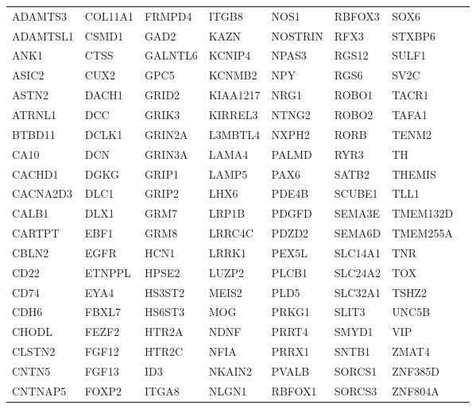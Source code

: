 \begin{tabular}{llllllll}
ADAMTS3 & COL11A1 & FRMPD4 & ITGB8 & NOS1 & RBFOX3 & SOX6 &  \\
ADAMTSL1 & CSMD1 & GAD2 & KAZN & NOSTRIN & RFX3 & STXBP6 &  \\
ANK1 & CTSS & GALNTL6 & KCNIP4 & NPAS3 & RGS12 & SULF1 &  \\
ASIC2 & CUX2 & GPC5 & KCNMB2 & NPY & RGS6 & SV2C &  \\
ASTN2 & DACH1 & GRID2 & KIAA1217 & NRG1 & ROBO1 & TACR1 &  \\
ATRNL1 & DCC & GRIK3 & KIRREL3 & NTNG2 & ROBO2 & TAFA1 &  \\
BTBD11 & DCLK1 & GRIN2A & L3MBTL4 & NXPH2 & RORB & TENM2 &  \\
CA10 & DCN & GRIN3A & LAMA4 & PALMD & RYR3 & TH &  \\
CACHD1 & DGKG & GRIP1 & LAMP5 & PAX6 & SATB2 & THEMIS &  \\
CACNA2D3 & DLC1 & GRIP2 & LHX6 & PDE4B & SCUBE1 & TLL1 &  \\
CALB1 & DLX1 & GRM7 & LRP1B & PDGFD & SEMA3E & TMEM132D &  \\
CARTPT & EBF1 & GRM8 & LRRC4C & PDZD2 & SEMA6D & TMEM255A &  \\
CBLN2 & EGFR & HCN1 & LRRK1 & PEX5L & SLC14A1 & TNR &  \\
CD22 & ETNPPL & HPSE2 & LUZP2 & PLCB1 & SLC24A2 & TOX &  \\
CD74 & EYA4 & HS3ST2 & MEIS2 & PLD5 & SLC32A1 & TSHZ2 &  \\
CDH6 & FBXL7 & HS6ST3 & MOG & PRKG1 & SLIT3 & UNC5B &  \\
CHODL & FEZF2 & HTR2A & NDNF & PRRT4 & SMYD1 & VIP &  \\
CLSTN2 & FGF12 & HTR2C & NFIA & PRRX1 & SNTB1 & ZMAT4 &  \\
CNTN5 & FGF13 & ID3 & NKAIN2 & PVALB & SORCS1 & ZNF385D &  \\
CNTNAP5 & FOXP2 & ITGA8 & NLGN1 & RBFOX1 & SORCS3 & ZNF804A &  \\
\end{tabular}
